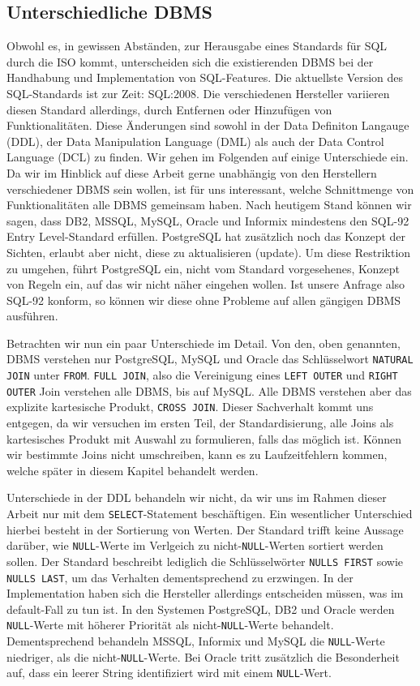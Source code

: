 \subsection{Unterschiedliche DBMS}

Obwohl es, in gewissen Abständen, zur Herausgabe eines Standards für SQL durch die ISO kommt, unterscheiden sich die existierenden DBMS bei der Handhabung und Implementation von SQL-Features. Die aktuellste Version des SQL-Standards ist zur Zeit: SQL:2008. Die verschiedenen Hersteller variieren diesen Standard allerdings, durch Entfernen oder Hinzufügen von Funktionalitäten. Diese Änderungen sind sowohl in der Data Definiton Langauge (DDL), der Data Manipulation Language (DML) als auch der Data Control Language (DCL) zu finden. Wir gehen im Folgenden auf einige Unterschiede ein. Da wir im Hinblick auf diese Arbeit gerne unabhängig von den Herstellern verschiedener DBMS sein wollen, ist für uns interessant, welche Schnittmenge von Funktionalitäten alle DBMS gemeinsam haben. Nach heutigem Stand können wir sagen, dass DB2, MSSQL, MySQL, Oracle und Informix mindestens den SQL-92 Entry Level-Standard erfüllen. PostgreSQL hat zusätzlich noch das Konzept der Sichten, erlaubt aber nicht, diese zu aktualisieren (update). Um diese Restriktion zu umgehen, führt PostgreSQL ein, nicht vom Standard vorgesehenes, Konzept von Regeln ein, auf das wir nicht näher eingehen wollen. Ist unsere Anfrage also SQL-92 konform, so können wir diese ohne Probleme auf allen gängigen DBMS ausführen.

Betrachten wir nun ein paar Unterschiede im Detail. Von den, oben genannten, DBMS verstehen nur PostgreSQL, MySQL und Oracle das Schlüsselwort \verb|NATURAL JOIN| unter \verb|FROM|. \verb|FULL JOIN|, also die Vereinigung eines \verb|LEFT OUTER| und \verb|RIGHT OUTER| Join verstehen alle DBMS, bis auf MySQL. Alle DBMS verstehen aber das explizite kartesische  Produkt, \verb|CROSS JOIN|. Dieser Sachverhalt kommt uns entgegen, da wir versuchen im ersten Teil, der Standardisierung, alle Joins als kartesisches Produkt mit Auswahl zu formulieren, falls das möglich ist. Können wir bestimmte Joins nicht umschreiben, kann es zu Laufzeitfehlern kommen, welche später in diesem Kapitel behandelt werden.

Unterschiede in der DDL behandeln wir nicht, da wir uns im Rahmen dieser Arbeit nur mit dem \verb|SELECT|-Statement beschäftigen. Ein wesentlicher Unterschied hierbei besteht in der Sortierung von Werten. Der Standard trifft keine Aussage darüber, wie \verb|NULL|-Werte im Verlgeich zu nicht-\verb|NULL|-Werten sortiert werden sollen. Der Standard beschreibt lediglich die Schlüsselwörter \verb|NULLS FIRST| sowie \verb|NULLS LAST|, um das Verhalten dementsprechend zu erzwingen. In der Implementation haben sich die Hersteller allerdings entscheiden müssen, was im default-Fall zu tun ist. In den Systemen PostgreSQL, DB2 und Oracle werden \verb|NULL|-Werte mit höherer Priorität als nicht-\verb|NULL|-Werte behandelt. Dementsprechend behandeln MSSQL, Informix und MySQL die \verb|NULL|-Werte niedriger, als die nicht-\verb|NULL|-Werte. Bei Oracle tritt zusätzlich die Besonderheit auf, dass ein leerer String identifiziert wird mit einem \verb|NULL|-Wert.

